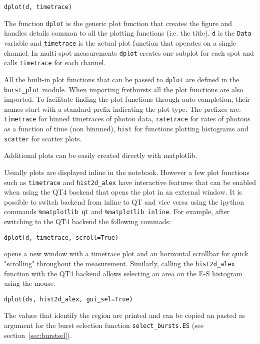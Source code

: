 \begin{verbatim}
dplot(d, timetrace)
\end{verbatim}

The function \verb|dplot| is the generic plot function that creates the figure
and handles details common to all the plotting functions (i.e. the title).
\verb|d| is the \verb|Data| variable and \verb|timetrace| is the actual plot
function that operates on a single channel. In multi-spot measurements
\verb|dplot| creates one subplot for each spot and calls \verb|timetrace| for
each channel.

All the built-in plot functions that can be passed to 
\verb|dplot| are defined in the 
\href{http://fretbursts.readthedocs.org/en/latest/plots.html}{\texttt{burst\_plot} module}. 
When importing fretbursts all the plot functions are also imported. 
To facilitate finding the plot functions through auto-completion, 
their names start with a standard prefix indicating the
plot type. The prefixes are: \verb|timetrace| for binned timetraces
of photon data, \verb|ratetrace| for rates of photons as a function of time (non
binnned), \verb|hist| for functions plotting histograms and \verb|scatter| for
scatter plots.

Additional plots can be easily created directly with matplotlib.

Usually plots are displayed inline in the notebook. However a few plot functions
 such as \verb|timetrace| and \verb|hist2d_alex| have interactive features that
can be enabled when using the QT4 backend that opens the plot in an external
window. It is possible to switch backend from inline to QT and vice versa using
the ipython commands \verb|%matplotlib qt|
and \verb|%matplotlib inline|. For example, after switching to the QT4 backend
the following commads:

\begin{verbatim}
dplot(d, timetrace, scroll=True)
\end{verbatim}

opens a new window with a timetrace plot and an horizontal scrollbar for quick
"scrolling" throughout the measurement.
Similarly, calling the \verb|hist2d_alex| function with the QT4 backend allows
selecting an area on the E-S histogram using the mouse.

\begin{verbatim}
dplot(ds, hist2d_alex, gui_sel=True)
\end{verbatim}

The values that identify the region are printed and can be copied an pasted as
argument for the burst selection function \verb|select_bursts.ES| (see
section~\ref{sec:burstsel}).

